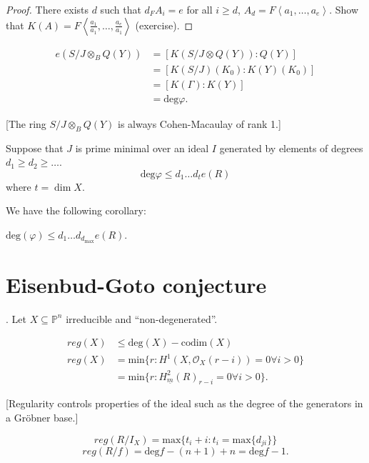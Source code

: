 \begin{proof}
There exists $d$ such that $d_F A_i=e$
for all $i \geq d$,
$A_d=F\left\langle{}a_1,…,a_e\right\rangle{}$.
Show that $K(A)= F
\left\langle{}\frac{a_1}{a_1},…,\frac{a_e}{a_1}
\right\rangle{}$
(exercise).
\end{proof}

\noindent
[Then]
$$
\begin{aligned}
e(S/J \otimes_B Q(Y))
&=[K(S/J \otimes Q(Y)):Q(Y)]\\
&=[K(S/J)(K_0):K(Y)(K_0)]\\
&=[K(\Gamma):K(Y)]\\
&=\text{deg} \varphi.
\end{aligned}
$$


[The ring $S/J \otimes_B Q(Y)$ is always
Cohen-Macaulay of rank 1.]

\begin{theorem}
\label{theorem-minimal}
Suppose that $J$ is prime minimal over an
ideal $I$
generated by elements of degrees $d_1 \geq
d_2 \geq …$.
$$
\text{deg}\varphi\leq  d_1…d_{t}e(R)
$$
where $t=\dim X$.

\end{theorem}

\noindent
We have the following corollary:
\begin{corollary}
\label{lemma-minimal}
$\text{deg}(\varphi)\leq  d_1…
d_{d_\text{max}}e(R)$.
\end{corollary}

\section{Eisenbud-Goto conjecture}
\label{section-eisenbud-goto-conjecture}

.
Let $X \subseteq \mathbb{P}^n$ irreducible
and ``non-degenerated''.

$$
\begin{aligned}
reg(X) &\leq  \text{deg}(X) -
\text{codim}(X)\\
reg(X)&=
\text{min}\{r:H^1(X,\mathcal{O}_X(r-i))=
0\forall
i >0\}\\
&=\text{min} \{r:
H^2_{\underline{m}}(R)_{r-i}=0 \forall
i>0\}.
\end{aligned}
$$

[Regularity controls properties of the ideal
such as the degree of the generators in a
Gröbner base.]

$$
reg(R/I_X)
=\text{max}
\{t_i+i:t_i=\text{max}\{d_{ji}\}\}
$$
$$
reg(R/f)=\text{deg}f-(n+1)+n=\text{deg}f-1.
$$

